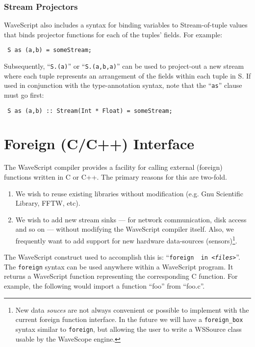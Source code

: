 \documentclass[twocolumn]{report}
\newenvironment{wscode}{\begin{center}\tt}{\end{center}}
\begin{document}
\subsection{Stream Projectors}

WaveScript also includes a syntax for binding variables to
Stream-of-tuple values that binds projector functions for each of
the tuples' fields.  For example:

\begin{wscode}
S as (a,b) = someStream;
\end{wscode}

Subsequently, ``{\tt S.(a)}'' or ``{\tt S.(a,b,a)}'' can be used to
project-out a new stream where each tuple represents an arrangement of
the fields within each tuple in {S}.  If used in conjunction with the
type-annotation syntax, note that the ``{\tt as}'' clause must go first:

\begin{wscode}
S as (a,b) :: Stream(Int * Float) = someStream;
\end{wscode}





\chapter{Foreign (C/C++) Interface}

The WaveScript compiler provides a facility for calling external
(foreign) functions written in C or C++.  The primary reasons for this
are two-fold.

\begin{enumerate}
\item We wish to reuse existing libraries without modification (e.g. Gnu
  Scientific Library, FFTW, etc).
\item We wish to add new stream sinks --- for network communication, disk access and so
  on --- without modifying the WaveScript compiler itself.  Also, we
  frequently want to add support for new hardware data-sources
  (sensors)\footnote{New data {\em souces} are not always convenient
  or possible to implement
  with the current foreign function interface.  In the future we will
  have a {\tt foreign\_box} syntax similar to {\tt foreign}, but
  allowing the user to write a WSSource class usable by the WaveScope engine.}.
\end{enumerate}

The WaveScript construct used to accomplish this is:
  ``{\tt foreign {\em <function-name>} in {\em <files>}}''.
The {\tt foreign} syntax can be used anywhere within a WaveScript
program.  It returns a WaveScript function representing the
corresponding C function.
For example, the following would import a function ``foo'' from ``foo.c''.
\end{document}
